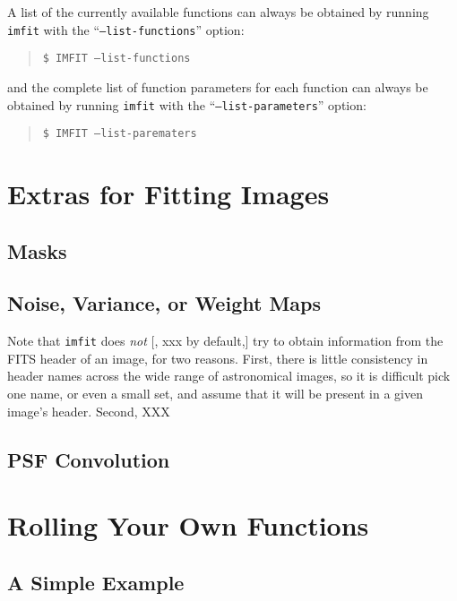 \documentclass[10pt]{article}
\newcommand{\imfit}{\texttt{imfit}}
\begin{document}
A list of the currently available functions can always be obtained
by running \imfit{} with the ``\texttt{--list-functions}'' option:
\begin{quote}
  \texttt{\$ IMFIT --list-functions}
\end{quote}
and the complete list of function parameters for each function can always be
obtained by running \imfit{} with the ``\texttt{--list-parameters}'' option:
\begin{quote}
  \texttt{\$ IMFIT --list-parematers}
\end{quote}




\section{Extras for Fitting Images}

\subsection{Masks}

\subsection{Noise, Variance, or Weight Maps}

Note that \imfit{} does \textit{not} [, xxx by default,] try to obtain information
from the FITS header of an image, for two reasons. First, there is little
consistency in header names across the wide range of astronomical images, so
it is difficult pick one name, or even a small set, and assume that it will
be present in a given image's header. Second, XXX


\subsection{PSF Convolution}




\section{Rolling Your Own Functions}

\subsection{A Simple Example}
\end{document}
